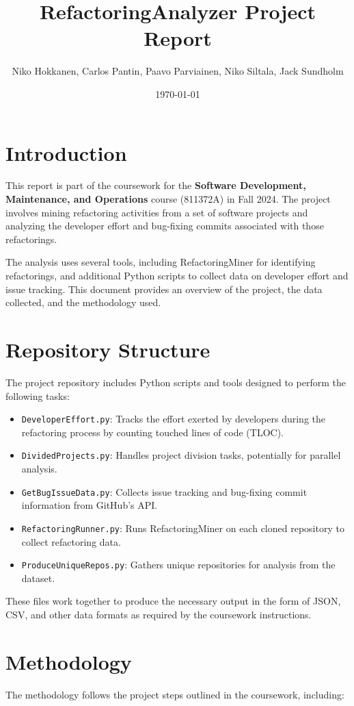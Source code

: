 \documentclass[sigconf]{acmart}
\title{RefactoringAnalyzer Project Report}
\author{Niko Hokkanen, Carlos Pantin, Paavo Parviainen, Niko Siltala, Jack Sundholm}
\date{\today}
\begin{document}
\maketitle

\section{Introduction}
This report is part of the coursework for the \textbf{Software Development, Maintenance, and Operations} course (811372A) in Fall 2024. The project involves mining refactoring activities from a set of software projects and analyzing the developer effort and bug-fixing commits associated with those refactorings.

The analysis uses several tools, including RefactoringMiner for identifying refactorings, and additional Python scripts to collect data on developer effort and issue tracking. This document provides an overview of the project, the data collected, and the methodology used.

\section{Repository Structure}
The project repository includes Python scripts and tools designed to perform the following tasks:

\begin{itemize}
  \item \texttt{DeveloperEffort.py}: Tracks the effort exerted by developers during the refactoring process by counting touched lines of code (TLOC).
  \item \texttt{DividedProjects.py}: Handles project division tasks, potentially for parallel analysis.
  \item \texttt{GetBugIssueData.py}: Collects issue tracking and bug-fixing commit information from GitHub's API.
  \item \texttt{RefactoringRunner.py}: Runs RefactoringMiner on each cloned repository to collect refactoring data.
  \item \texttt{ProduceUniqueRepos.py}: Gathers unique repositories for analysis from the dataset.
\end{itemize}

These files work together to produce the necessary output in the form of JSON, CSV, and other data formats as required by the coursework instructions.

\section{Methodology}
The methodology follows the project steps outlined in the coursework, including:
\end{document}
